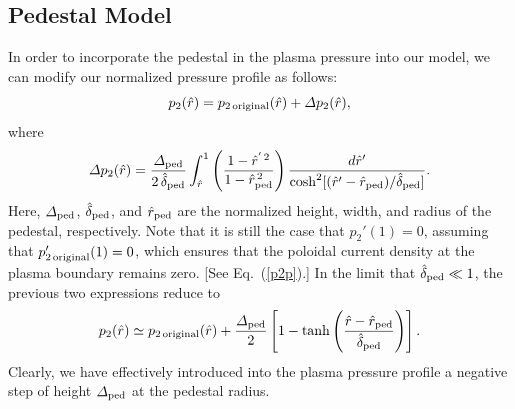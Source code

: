 \documentclass[12pt,prb,aps]{revtex4-1}
\begin{document}
\subsection{Pedestal Model}
 In order to incorporate the pedestal in the plasma pressure into our model, we can modify our normalized pressure profile as follows:
 \begin{equation}
 p_2(\hat{r})=  p_{2\,{\rm original}}(\hat{r})+ {\mit\Delta}p_2(\hat{r}),
 \end{equation}
 where
 \begin{equation}\label{e146}
{\mit\Delta}p_2(\hat{r})= \frac{{\mit\Delta}_{\rm ped}}{2\,\hat{\delta}_{\rm ped}}
 \int_{\hat{r}}^1
 \left(\frac{1-\hat{r}^{'\,2}}{1-\hat{r}_{\rm ped}^{\,2}}\right)\frac{d\hat{r}'}{\cosh^2[(\hat{r}'-\hat{r}_{\rm ped})/\hat{\delta}_{\rm ped}]}.
 \end{equation}
 Here, ${\mit\Delta}_{\rm ped}$, $\hat{\delta}_{\rm ped}$, and $\hat{r}_{\rm ped}$ are the normalized height, width, and radius of the
 pedestal, respectively. Note that it is still the case that $p_2'(1)=0$, assuming that $p_{2\,{\rm original}}'(1)=0$, which ensures that the poloidal current  density at the plasma boundary
 remains zero. [See Eq.~(\ref{p2p}).] In the limit that $\hat{\delta}_{\rm ped}\ll 1$, the previous two expressions reduce to
 \begin{equation}
 p_2(\hat{r})\simeq p_{2\,{\rm original}}(\hat{r}) + \frac{{\mit\Delta}_{\rm ped}}{2}
 \left[ 1 - \tanh\left(\frac{\hat{r}- \hat{r}_{\rm ped}}{\hat{\delta}_{\rm ped}}\right)\right].
 \end{equation}
 Clearly, we have effectively introduced into the plasma pressure profile a negative step of height ${\mit\Delta}_{\rm ped}$ at the pedestal radius.
 
\end{document}
